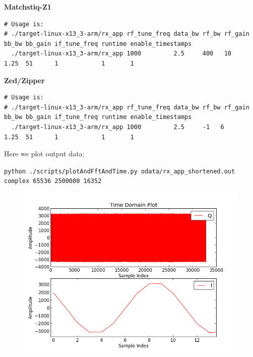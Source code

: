 \documentclass{article}
\begin{document}
\noindent\textbf{Matchstiq-Z1}\\
\scriptsize
\noindent
\begin{verbatim}
# Usage is:
# ./target-linux-x13_3-arm/rx_app rf_tune_freq data_bw rf_bw rf_gain bb_bw bb_gain if_tune_freq runtime enable_timestamps
  ./target-linux-x13_3-arm/rx_app 1000         2.5     400   10      1.25  51      1            1       1
\end{verbatim}
\par\medskip

\normalsize
\noindent\textbf{Zed/Zipper}\\
\scriptsize
\noindent
\begin{verbatim}
# Usage is:
# ./target-linux-x13_3-arm/rx_app rf_tune_freq data_bw rf_bw rf_gain bb_bw bb_gain if_tune_freq runtime enable_timestamps
  ./target-linux-x13_3-arm/rx_app 1000         2.5     -1   6      1.25  51      1            1       1
\end{verbatim}
\par\medskip
\small
\noindent Here we plot output data:\par\medskip
\noindent\texttt{python ./scripts/plotAndFftAndTime.py odata/rx\_app\_shortened.out complex 65536 2500000 16352}\par\medskip
\pagebreak
        \begin{figure}[h]
                \centering
                \includegraphics[scale=.5]{rx_app_sig_gen_time_domain}
                \label{fig:rx_app_sig_gen_time_domain}
        \end{figure}
\end{document}
